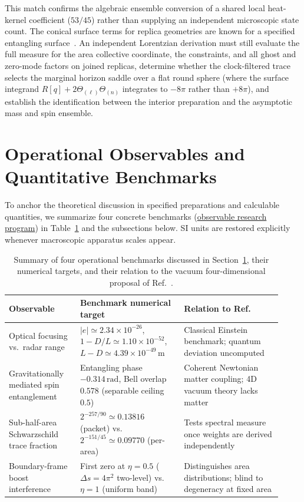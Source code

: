 \documentclass[10pt,a4paper]{article}
\numberwithin{equation}{section}
\newcommand{\repo}[2]{\href{https://github.com/sprajs/quantum-gravity/blob/main/#1}{#2}}
\begin{document}
This match confirms the algebraic ensemble conversion of a shared local heat-kernel coefficient ($53/45$) rather than supplying an independent microscopic state count.
The conical surface terms for replica geometries are known for a specified entangling surface~\cite{FursaevPatrushevSolodukhin2013}. An independent Lorentzian derivation must still evaluate the full measure for the area collective coordinate, the constraints, and all ghost and zero-mode factors on joined replicas, determine whether the clock-filtered trace selects the marginal horizon saddle over a flat round sphere (where the surface integrand $R[q]+2\Theta_{(\ell)}\Theta_{(n)}$ integrates to $-8\pi$ rather than $+8\pi$), and establish the identification between the interior preparation and the asymptotic mass and spin ensemble.

\section{Operational Observables and Quantitative Benchmarks}
\label{sec:observables}

To anchor the theoretical discussion in specified preparations and calculable quantities, we summarize four concrete benchmarks (\repo{OBSERVABLES.md}{observable research program}) in Table~\ref{tab:observables} and the subsections below.
SI units are restored explicitly whenever macroscopic apparatus scales appear.

\begin{table}[htbp]
\centering
\caption{Summary of four operational benchmarks discussed in Section~\ref{sec:observables}, their numerical targets, and their relation to the vacuum four-dimensional proposal of Ref.~\cite{Chandrasekaran2026}.}
\label{tab:observables}
\small
\begin{tabular}{@{} >{\raggedright\arraybackslash}p{0.24\linewidth} >{\raggedright\arraybackslash}p{0.35\linewidth} >{\raggedright\arraybackslash}p{0.33\linewidth} @{}}
\toprule
Observable & Benchmark numerical target & Relation to Ref.~\cite{Chandrasekaran2026} \\
\midrule
Optical focusing vs.\ radar range & $|e|\simeq 2.34\times 10^{-26}$, $1-D/L\simeq 1.10\times 10^{-52}$, $L-D\simeq 4.39\times 10^{-49}\,\mathrm{m}$ & Classical Einstein benchmark; quantum deviation uncomputed \\
\addlinespace[4pt]
Gravitationally mediated spin entanglement & Entangling phase $-0.314\,\mathrm{rad}$, Bell overlap $0.578$ (separable ceiling $0.5$) & Coherent Newtonian matter coupling; 4D vacuum theory lacks matter \\
\addlinespace[4pt]
Sub-half-area Schwarzschild trace fraction & $2^{-257/90}\simeq 0.13816$ (packet) vs.\ $2^{-151/45}\simeq 0.09770$ (per-area) & Tests spectral measure once weights are derived independently \\
\addlinespace[4pt]
Boundary-frame boost interference & First zero at $\eta=0.5$ ($\Delta s=4\pi^2$ two-level) vs.\ $\eta=1$ (uniform band) & Distinguishes area distributions; blind to degeneracy at fixed area \\
\bottomrule
\end{tabular}
\end{table}
\end{document}
